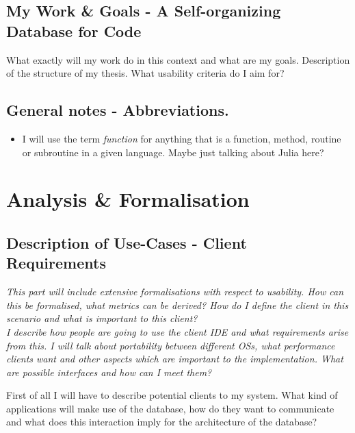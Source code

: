 \documentclass[11p]{scrartcl}
\begin{document}
\subsection{My Work \& Goals - A Self-organizing Database for Code}
What exactly will my work do in this context and what are my goals. 
Description of the structure of my thesis. What usability criteria do I aim for?\\

\subsection*{General notes - Abbreviations.}
\begin{itemize}
	\item I will use the term \textit{function} for anything that is a function, method, routine or subroutine in a given language. Maybe just talking about Julia here?
\end{itemize}



\section{Analysis \& Formalisation}
\label{sec:analysis}

\subsection{Description of Use-Cases - Client Requirements}
\label{sec:clientReq}
\textit{This part will include extensive formalisations with respect to usability. How can this be formalised, what metrics can be derived? How do I define the client in this scenario and what is important to this client?\\
I describe how people are going to use the client IDE and what requirements arise from this. I will talk about portability between different OSs, what performance clients want and other aspects which are important to the implementation. What are possible interfaces and how can I meet them?}

First of all I will have to describe potential clients to my system. What kind of applications will make use of the database, how do they want to communicate and what does this interaction imply for the architecture of the database?
\end{document}
